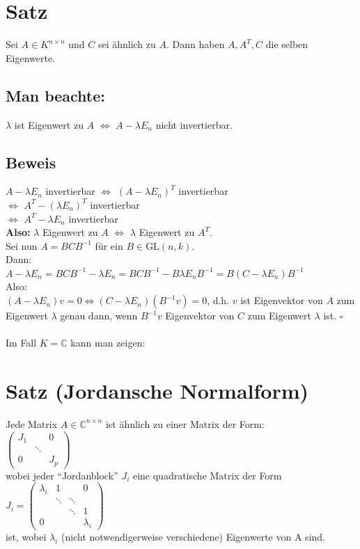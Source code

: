 \documentclass{scrbook}
\begin{document}
\section{Satz}
Sei $A\in K^{n \times n}$ und $C$ sei ähnlich zu $A$. Dann haben $A,A^T,C$ die selben Eigenwerte.
\subsection*{Man beachte:}
$\lambda$ ist Eigenwert zu $A$ $\Leftrightarrow$ $A-\lambda E_n$ nicht invertierbar.
\subsection*{Beweis}
$A-\lambda E_n$ invertierbar $\Leftrightarrow$ $(A-\lambda E_n)^T$ invertierbar\\$\Leftrightarrow$ $A^T-(\lambda E_n)^T$ invertierbar\\$\Leftrightarrow$ $A^T - \lambda E_n$ invertierbar\\
\textbf{Also:} $\lambda$ Eigenwert zu $A$ $\Leftrightarrow$ $\lambda$ Eigenwert zu $A^T$.\\
Sei nun $A=BCB^{-1}$ für ein $B\in \text{GL}(n,k)$.\\
Dann:\\
$A-\lambda E_n = BCB^{-1} -\lambda E_n = BCB^{-1} - B\lambda E_n B^{-1} = B(C-\lambda E_n) B^{-1}$\\
Also:\\
$(A-\lambda E_n) v= 0 \Leftrightarrow (C-\lambda E_n)(B^{-1}v)=0$, d.h. $v$ ist Eigenvektor von $A$ zum Eigenwert $\lambda$ genau dann, wenn $B^{-1}v$ Eigenvektor von $C$ zum Eigenwert $\lambda$ ist. $\square$\\\\
Im Fall $K= \mathbb{C}$ kann man zeigen:
\section{Satz (Jordansche Normalform)}
Jede Matrix $A\in \mathbb{C}^{n \times n}$ ist ähnlich zu einer Matrix der Form:\\
$
\left(
\begin{array}{ccc}
J_1&&0\\
&\ddots&\\
0&&J_p
\end{array}
\right)
$\\
wobei jeder "`Jordanblock"' $J_i$ eine quadratische Matrix der Form\\
$J_i=\left(
\begin{array}{cccc}
\lambda_i &1 &&0\\
&\ddots&\ddots&\\
&&\ddots&1\\
0&&&\lambda_i
\end{array}
\right)$\\
ist, wobei $\lambda_i$ (nicht notwendigerweise verschiedene) Eigenwerte von A sind.
\end{document}

